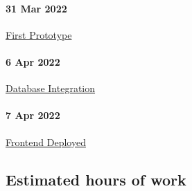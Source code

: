 \documentclass{article}
\begin{document}
\paragraph{31 Mar 2022} \href{https://www.openlearning.com/u/hayeschoy-r7a9ti/blog/SomethingAwesomeFirstPrototype/}{First Prototype}
\paragraph{6 Apr 2022} \href{https://www.openlearning.com/u/hayeschoy-r7a9ti/blog/SomethingAwesomeDatabaseIntegration/}{Database Integration}
\paragraph{7 Apr 2022} \href{https://www.openlearning.com/u/hayeschoy-r7a9ti/blog/SomethingAwesomeFrontendDeployed/}{Frontend Deployed}

\subsection{\label{blogs}Estimated hours of work}
\end{document}
